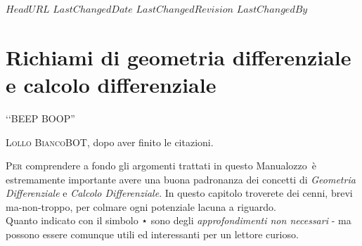 \svnidlong
{$HeadURL$}
{$LastChangedDate$}
{$LastChangedRevision$}
{$LastChangedBy$}

\chapter{Richiami di geometria differenziale e calcolo differenziale}
\begin{introduction}
	‘‘BEEP BOOP''
	\begin{flushright}
		\textsc{Lollo BiancoBOT}, dopo aver finito le citazioni. %
	\end{flushright}
\end{introduction}
\lettrine[findent=1pt, nindent=0pt]{P}{er} comprendere a fondo gli argomenti trattati in questo Manualozzo\texttrademark\ è estremamente importante avere una buona padronanza dei concetti di \textit{Geometria Differenziale} e \textit{Calcolo Differenziale}. In questo capitolo troverete dei cenni, brevi ma-non-troppo, per colmare ogni potenziale lacuna a riguardo.\\
Quanto indicato con il simbolo ⋆ sono degli \textit{approfondimenti non necessari} - ma possono essere comunque utili ed interessanti per un lettore curioso.
